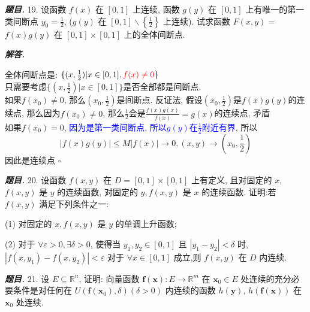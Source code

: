 \documentclass[10pt, a4paper, oneside]{ctexart}
\newenvironment{problem}{\begin{framed}\par\noindent\textbf{\textit{题目. }}}{\end{framed}\par}
\newenvironment{solution}{%
  \par\noindent\textbf{\textit{解答. }}\ignorespaces
}{%
  \hfill\ensuremath{\square}\par %
}
\begin{document}
\begin{problem}
19. 设函数 $f(x)$ 在 $[0,1]$ 上连续, 函数 $g(y)$ 在 $[0,1]$ 上有唯一的第一类间断点 $y_0=\frac{1}{2}$, ($g(y)$ 在 $[0,1] \backslash\left\{\frac{1}{2}\right\}$ 上连续). 试求函数 $F(x, y)=$ $f(x) g(y)$ 在 $[0,1] \times[0,1]$ 上的全体间断点.
\end{problem}
\begin{solution}
全体间断点是: $\{(x,\frac{1}{2})| x\in [0,1], \textcolor{red}{f(x)\neq 0} \}$\\
只需要考虑$\{(x,\frac{1}{2})| x\in [0,1]\}$是否全部都是间断点.\\
如果$f(x_0)\neq 0$, 那么$(x_0,\frac{1}{2})$是间断点. 反证法, 假设$(x_0,\frac{1}{2})$是$f(x)g(y)$的连续点, 那么因为$f(x_0)\neq 0$, 那么$\frac{1}{2}$会是$\frac{f(x)g(x)}{f(x)}=g(x)$的连续点, 矛盾\\
如果$f(x_0)=0$, \textcolor{blue}{因为是第一类间断点, 所以$g(y)$在$\frac{1}{2}$附近有界}, 所以
$$ |f(x)g(y)|\leq M|f(x)|\to 0, (x,y)\to (x_0,\frac{1}{2})$$
因此是连续点
\end{solution}

\begin{problem}
20. 设函数 $f(x, y)$ 在 $D=[0,1] \times[0,1]$ 上有定义, 且对固定的 $x$, $f(x, y)$ 是 $y$ 的连续函数, 对固定的 $y, f(x, y)$ 是 $x$ 的连续函数. 证明:若 $f(x, y)$ 满足下列条件之一:
    
(1) 对固定的 $x, f(x, y)$ 是 $y$ 的单调上升函数;
    
(2) 对于 $\forall \varepsilon>0, \exists \delta>0$, 使得当 $y_1, y_2 \in[0,1]$ 且 $\left|y_1-y_2\right|<\delta$ 时, $\left|f\left(x, y_1\right)-f\left(x, y_2\right)\right|<\varepsilon$ 对于 $\forall x \in[0,1]$ 成立,则 $f(x, y)$ 在 $D$ 内连续.
\end{problem}

\begin{problem}
21. 设 $E \subseteq \mathbb{R}^n$, 证明: 向量函数 $\boldsymbol{f}(\boldsymbol{x}): E \rightarrow \mathbb{R}^m$ 在 $\boldsymbol{x}_0 \in E$ 处连续的充分必要条件是对任何在 $U\left(\boldsymbol{f}\left(\boldsymbol{x}_0\right), \delta\right)(\delta>0)$ 内连续的函数 $h(\boldsymbol{y})$, $h(\boldsymbol{f}(\boldsymbol{x}))$ 在 $\boldsymbol{x}_0$ 处连续.
\end{problem}
\end{document}
